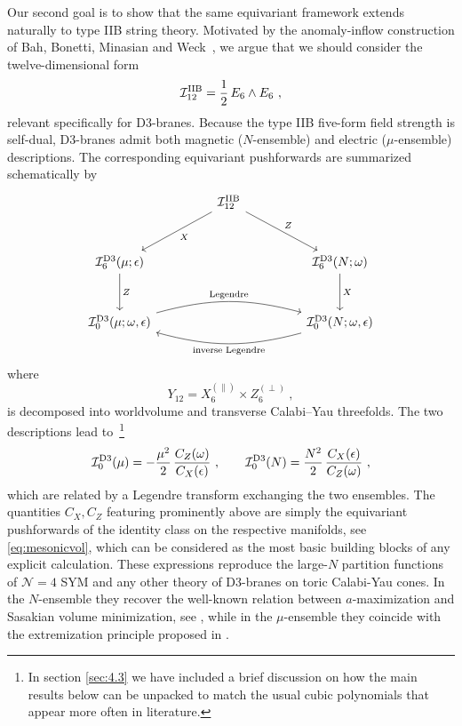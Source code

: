 \documentclass[11pt,a4paper]{article}
\def\cI{{\cal I}}
\theoremstyle{definition}
\theoremstyle{identity}
\theoremstyle{remark}
\newcommand{\be}{\begin{equation}}
\newcommand{\ee}{\end{equation}}
\begin{document}
Our second goal is to show that the same equivariant framework extends naturally to
type IIB string theory. Motivated by the anomaly-inflow construction of
Bah, Bonetti, Minasian and Weck~\cite{Bah:2020jas}, we argue that we should consider the
twelve-dimensional form
\be
\label{eq:Banom}
\cI_{12}^{\rm IIB}
= \frac12\,
E_6\wedge E_6\ ,
\ee
relevant specifically for D3-branes. Because the type IIB five-form field strength is self-dual, D3-branes admit both magnetic
($N$-ensemble) and electric ($\mu$-ensemble) descriptions. The corresponding equivariant
pushforwards are summarized schematically by
\begin{equation}
\label{diagram:2}
\begin{tikzcd}[column sep=4.5em,row sep=3em]
& \cI_{12}^{\rm IIB}
  \arrow[dl,"X"]
  \arrow[dr,"Z"] & \\
\cI^{\rm D3}_6(\mu;\epsilon)
  \arrow[d,"Z"]
&&
\cI^{\rm D3}_6(N;\omega)
  \arrow[d,"X"] \\
\cI^{\rm D3}_0(\mu;\omega,\epsilon)
  \arrow[rr,"\text{Legendre}",bend left=15]
&&
\cI^{\rm D3}_0(N;\omega,\epsilon)
  \arrow[ll,"\text{inverse Legendre}",bend left=15]
\end{tikzcd}
\end{equation}
where
\be
Y_{12}=X_6^{(\parallel)}\times Z_6^{(\perp)}\ ,
\ee
is decomposed into worldvolume and transverse Calabi--Yau threefolds.
The two descriptions lead to~\footnote{In section \ref{sec:4.3} we have included a brief discussion on how the main results below can be unpacked to match the usual cubic polynomials that appear more often in literature.}
\be
\cI_0^{\rm D3}(\mu)
=-
\frac{\mu^2}{2}\,
\frac{C_Z(\omega)}{C_X(\epsilon)}\ ,
\qquad
\cI_0^{\rm D3}(N)
=
\frac{N^2}{2}\,
\frac{C_X(\epsilon)}{C_Z(\omega)}\ ,
\ee
which are related by a Legendre transform exchanging the two ensembles. The quantities $C_X, C_Z$ featuring prominently above are simply the equivariant pushforwards of the identity class on the respective manifolds, see \eqref{eq:mesonicvol}, which can be considered as the most basic building blocks of any explicit calculation. These expressions reproduce the large-$N$
partition functions of $\mathcal N=4$ SYM and any other theory of D3-branes on toric Calabi-Yau cones. In the $N$-ensemble they recover the well-known
relation between $a$-maximization and Sasakian volume minimization, see \cite{Martelli:2005tp,Butti:2005vn,Butti:2005ps,Martelli:2006yb,Amariti:2011uw,Couzens:2018wnk,Gauntlett:2018dpc,Hosseini:2019use,Hosseini:2019ddy,Gauntlett:2019roi,Gauntlett:2019pqg,Boido:2022mbe}, while in the $\mu$-ensemble they coincide
with the extremization principle proposed in
\cite{Martelli:2023oqk,Colombo:2023fhu}.
\end{document}
